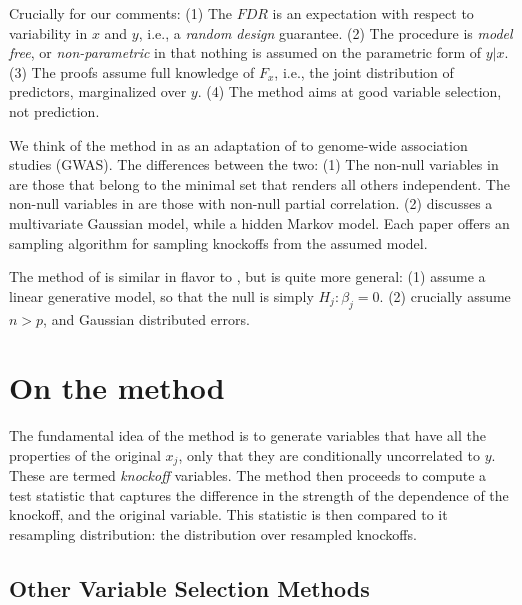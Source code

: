 \documentclass[article,lineno]{biometrika}
\begin{document}
Crucially for our comments:
(1) The $FDR$ is an expectation with respect to variability in $x$ and $y$, i.e., a \emph{random design} guarantee. 
(2) The procedure is \emph{model free}, or \emph{non-parametric} in that nothing is assumed on the parametric form of $y|x$. 
(3) The proofs assume full knowledge of $F_x$, i.e., the joint distribution of predictors, marginalized over $y$.
(4) The method aims at good variable selection, not prediction. 

We think of the method in \cite{SesiaGenehuntinghidden} as an adaptation of \cite{CandesPanninggoldmodelX2018} to genome-wide association studies (GWAS).
The differences between the two:
(1) The non-null variables in \cite{CandesPanninggoldmodelX2018} are those that belong to the minimal set that renders all others independent. The non-null variables in \cite{SesiaGenehuntinghidden} are those with non-null partial correlation. 
(2) \cite{CandesPanninggoldmodelX2018} discusses a multivariate Gaussian model, while \cite{SesiaGenehuntinghidden} a hidden Markov model. 
Each paper offers an sampling algorithm for sampling knockoffs from the assumed model. 

The method of \cite{SesiaGenehuntinghidden} is similar in flavor to \cite{BarberControllingfalsediscovery2015}, but \cite{SesiaGenehuntinghidden} is quite more general:
(1) \cite{BarberControllingfalsediscovery2015} assume a linear generative model, so that the null is simply $H_j:\beta_j=0$. 
(2) \cite{BarberControllingfalsediscovery2015} crucially assume $n>p$, and Gaussian distributed errors. 




\section{On the method}
The fundamental idea of the method is to generate variables that have all the properties of the original $x_j$, only that they are conditionally uncorrelated to $y$. 
These are termed \emph{knockoff} variables. 
The method then proceeds to compute a test statistic that captures the difference in the strength of the dependence of the knockoff, and the original variable. 
This statistic is then compared to it resampling distribution: the distribution over resampled knockoffs. 





\subsection{Other Variable Selection Methods}
\end{document}
